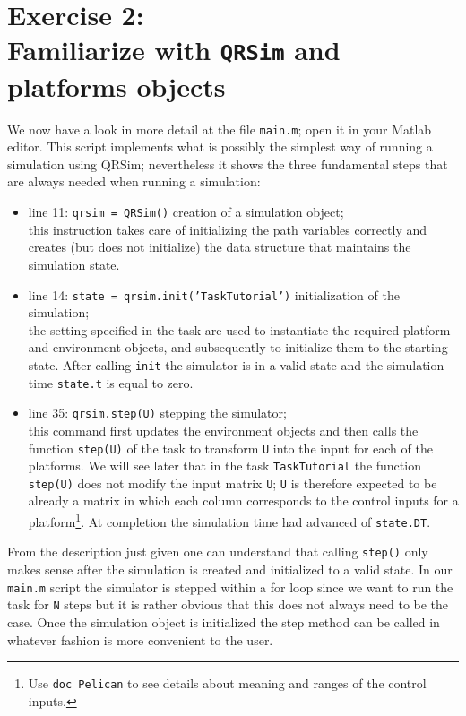 \documentclass[a4paper,11pt]{article}
\begin{document}
\section*{Exercise 2:\\Familiarize with \texttt{QRSim} and platforms objects}

We now have a look in more detail at the file \texttt{main.m}; open it in your Matlab editor. 
This script implements what is possibly the simplest way of running a simulation using QRSim; nevertheless it shows the three fundamental steps that are always needed when running a simulation:
\begin{itemize}
 \item line 11: \texttt{qrsim = QRSim()}  creation of a simulation object; \\
  this instruction takes care of initializing the path variables correctly and creates (but does not initialize) the data structure that maintains the simulation state. 
 \item line 14: \texttt{state = qrsim.init('TaskTutorial')} initialization of the simulation;\\
  the setting specified in the task are used to instantiate the required platform and environment objects, and subsequently to initialize them to the starting state. After calling \texttt{init} the simulator is in a valid state and the simulation time \texttt{state.t} is equal to zero.
 \item line 35: \texttt{qrsim.step(U)} stepping the simulator;\\
 this command first updates the environment objects and then calls the function \texttt{step(U)} of the task to transform \texttt{U} into the input for each of the platforms. We will see later that in the task \texttt{TaskTutorial} the function \texttt{step(U)} does not modify the input matrix \texttt{U}; \texttt{U} is therefore expected to be already a matrix in which each column corresponds to the control inputs for a platform\footnote{Use \texttt{doc Pelican} to see details about meaning and ranges of the control inputs.}. At completion the simulation time had advanced of \texttt{state.DT}.  
\end{itemize}
From the description just given one can understand that calling \texttt{step()} only makes sense after the simulation is created and initialized to a valid state. 
In our \texttt{main.m} script the simulator is stepped within a for loop since we want to run the task for \texttt{N} steps but it is rather obvious that this does not always need to be the case. Once the simulation object is initialized the step method can be called in whatever fashion is more convenient to the user.
\end{document}
